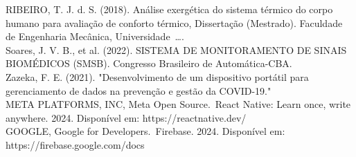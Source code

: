 \singlespacing
\noindent RIBEIRO, T. J. d. S. (2018). Análise exergética do sistema térmico do corpo humano para avaliação de conforto térmico, Dissertação (Mestrado). Faculdade de Engenharia Mecânica, Universidade ….
\\

\singlespacing
\noindent Soares, J. V. B., et al. (2022). SISTEMA DE MONITORAMENTO DE SINAIS BIOMÉDICOS (SMSB). Congresso Brasileiro de Automática-CBA.
\\

\singlespacing
\noindent Zazeka, F. E. (2021). "Desenvolvimento de um dispositivo portátil para gerenciamento de dados na prevenção e gestão da COVID-19."
\\

\singlespacing
\noindent META PLATFORMS, INC, Meta Open Source. React Native: Learn once, write anywhere. 2024. Disponível em: https://reactnative.dev/
\\

\singlespacing
\noindent GOOGLE, Google for Developers. Firebase. 2024. Disponível em: https://firebase.google.com/docs
\\